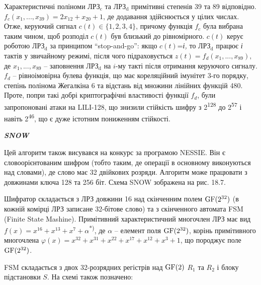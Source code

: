 \documentclass[a4paper]{article}
\newcommand\textsubscript[1]{\ensuremath{{}_{\text{#1}}}}
\newcounter{}
\newcommand\normalsubformula[1]{\text{\mathversion{normal}$#1$}}
\begin{document}
Характеристичні поліноми ЛРЗ\textsubscript{c} та ЛРЗ\textsubscript{d} примітивні
степенів 39 та 89 відповідно. 
${f_{{c}}(x_{{1}},\text{.}\text{.}\text{.},x_{{\text{39}}})=2x_{{\text{12}}}+x_{{\text{20}}}+1}$,
де додавання здійснюється у цілих числах. Отже, керуючий сигнал  ${c(t)\in
\{1,2,3,4\}}$, причому функція  ${f_{{c}}}$ була вибрана таким чином, щоб
розподіл  ${c(t)}$ був близький до рівномірного.  ${c(t)}$ керує роботою
ЛРЗ\textsubscript{d} за принципом “stop{}-and{}-go”: якщо  ${c(t)}$=\textit{і,
}то ЛРЗ\textsubscript{d} працює \textit{ і} тактів у звичайному режимі, після
чого  підраховується 
${z(t)=f_{{d}}(x_{{1}},\text{.}\text{.}\text{.},x_{{\text{89}}}),}$ де 
${x_{{1}},\text{.}\text{.}\text{.},x_{{\text{89}}}}$ – заповнення
ЛРЗ\textsubscript{d} на   ${i}${}-му такті після отримання керуючого сигналу. 
${f_{{d}}}$ – рівноімовірна булева функція, що має кореляційний імунітет 3-го
порядку, степінь полінома Жегалкіна 6 та відстань від множини лінійних функцій
480. Проте, попри такі добрі криптографічні властивості функції  ${f_{{d}}}$,
були запропоновані атаки на LILI{}-128, що знизили стійкість шифру з
2\textsuperscript{128} до 2\textsuperscript{57} і навіть 2\textsuperscript{46},
що є дуже істотним пониженням стійкості.  


\bigskip

{\centering\bfseries\itshape
SNOW
\par}


\bigskip

Цей алгоритм також висувався на конкурс за програмою NESSIE. Він є
словоорієнтованим шифром (тобто таким, де операції в основному виконуються над
словами), де слово має 32 двійкових розряди. Алгоритм може працювати  з
довжинами ключа 128 та 256 біт. Схема SNOW зображена на рис. 18.7.

Шифратор складається з ЛРЗ довжини 16 над скінченним полем 
${\normalsubformula{\text{GF}}(2^{{\text{32}}})}$ (в кожній комірці ЛРЗ
записане 32-бітове слово) та з скінченного автомата FSM (Finite State Mashine).
Примітивний характеристичний многочлен ЛРЗ  має вид 
${f(x)=x^{{\text{16}}}+x^{{\text{13}}}+x^{{7}}+\alpha }$\textsuperscript{*)},
де  ${\alpha }$ – елемент поля 
${\normalsubformula{\text{GF}}(2^{{\text{32}}})}$, корінь примітивного
многочлена  ${\varphi
(x)=x^{{\text{32}}}+x^{{\text{31}}}+x^{{\text{22}}}+x^{{\text{17}}}+x^{{\text{12}}}+x^{{3}}+1}$,
що породжує поле  ${\normalsubformula{\text{GF}}(2^{{\text{32}}})}$.

FSM складається з двох 32-розрядних регістрів над 
${\normalsubformula{\text{GF}}(2)}$  ${R_{{1}}}$ та  ${R_{{2}}}$ і блоку
підстановки  ${S}$. На схемі також позначено: 
\end{document}
